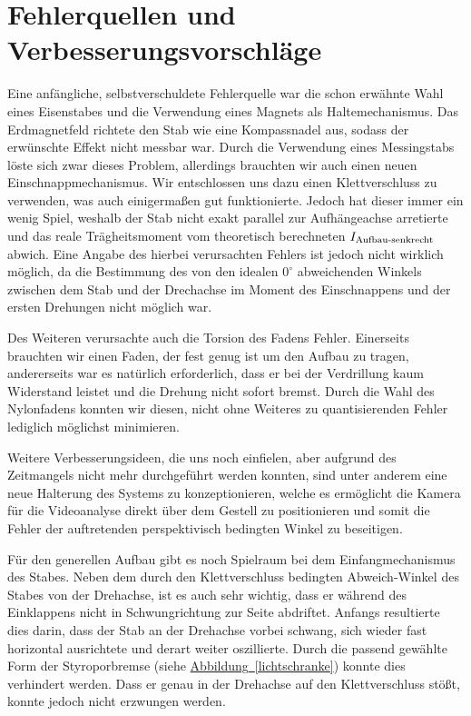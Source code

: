 \documentclass[11pt]{scrartcl}
\newcommand{\hypref}[2]{\hyperref[#2]{{#1}~\ref{#2}}}
\begin{document}
\section{Fehlerquellen und Verbesserungsvorschläge}\label{sec:verbesserung}
Eine anfängliche, selbstverschuldete Fehlerquelle war die schon erwähnte Wahl eines Eisenstabes und die Verwendung eines Magnets als Haltemechanismus. Das Erdmagnetfeld richtete den Stab wie eine Kompassnadel aus, sodass der erwünschte Effekt nicht messbar war. Durch die Verwendung eines Messingstabs löste sich zwar dieses Problem, allerdings brauchten wir auch einen neuen Einschnappmechanismus. Wir entschlossen uns dazu einen Klettverschluss zu verwenden, was auch einigermaßen gut funktionierte. Jedoch hat dieser immer ein wenig Spiel, weshalb der Stab nicht exakt parallel zur Aufhängeachse arretierte und das reale Trägheitsmoment vom theoretisch berechneten $I_{\textnormal{Aufbau-senkrecht}}$ abwich. Eine Angabe des hierbei verursachten Fehlers ist jedoch nicht wirklich möglich, da die Bestimmung des von den idealen $0^\circ$ abweichenden Winkels zwischen dem Stab und der Drechachse im Moment des Einschnappens und der ersten Drehungen nicht möglich war.

Des Weiteren verursachte auch die Torsion des Fadens Fehler. Einerseits brauchten wir einen Faden, der fest genug ist um den Aufbau zu tragen, andererseits war es natürlich erforderlich, dass er bei der Verdrillung kaum Widerstand leistet und die Drehung nicht sofort bremst. Durch die Wahl des Nylonfadens konnten wir diesen, nicht ohne Weiteres zu quantisierenden Fehler lediglich möglichst minimieren.

Weitere Verbesserungsideen, die uns noch einfielen, aber aufgrund des Zeitmangels nicht mehr durchgeführt werden konnten, sind unter anderem eine neue Halterung des Systems zu konzeptionieren, welche es ermöglicht die Kamera für die Videoanalyse direkt über dem Gestell zu positionieren und somit die Fehler der auftretenden perspektivisch bedingten Winkel zu beseitigen.

Für den generellen Aufbau gibt es noch Spielraum bei dem Einfangmechanismus des Stabes. Neben dem durch den Klettverschluss bedingten Abweich-Winkel des Stabes von der Drehachse, ist es auch sehr wichtig, dass er während des Einklappens nicht in Schwungrichtung zur Seite abdriftet. Anfangs resultierte dies darin, dass der Stab an der Drehachse vorbei schwang, sich wieder fast horizontal ausrichtete und derart weiter oszillierte. Durch die passend gewählte Form der Styroporbremse (siehe \hypref{Abbildung}{lichtschranke}) konnte dies verhindert werden. Dass er genau in der Drehachse auf den Klettverschluss stößt, konnte jedoch nicht erzwungen werden.
\end{document}
